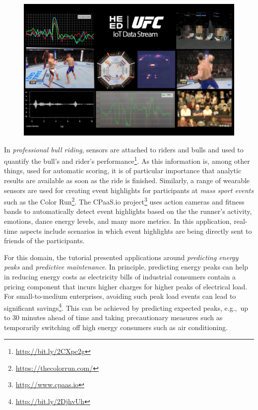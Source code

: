 \begin{figure}[t]
\centering
\includegraphics[scale=0.142]{pictures/DP6L8S9XkAYFMCw.jpg}
\vspace*{-2mm}
\label{FIG:FightStreams}
\vspace*{-5mm}
\end{figure}

In \emph{professional bull riding}, sensors are attached to riders and
bulls and used to quantify the bull's and rider's
performance\footnote{\url{http://bit.ly/2CXpc2g}}. As this information
is, among other things, used for automatic scoring, it is of
particular importance that analytic results are available as soon as
the ride is finished. Similarly, a range of wearable sensors are used
for creating event highlights for participants at \emph{mass sport
  events} such as the Color
Run\footnote{\url{https://thecolorrun.com/}}. The \textsf{\small
  CPaaS.io} project\footnote{\url{http://www.cpaas.io}} uses action
cameras and fitness bands to automatically detect event highlights
based on the the runner's activity, emotions, dance energy levels, and
many more metrics. In this application, real-time aspects include
scenarios in which event highlights are being directly sent to friends
of the participants.

For this domain, the tutorial presented applications around \emph{predicting energy peaks} and \emph{predictive maintenance}. In principle, predicting energy peaks can help in reducing energy costs as electricity bills of industrial consumers contain a pricing component that incurs higher charges for higher peaks of electrical load. For small-to-medium enterprises, avoiding such peak load events can lead to significant savings\footnote{\url{http://bit.ly/2DjhvUh}}. This can be achieved by predicting expected peaks, e.g.,\ up to 30 minutes ahead of time and taking precautionary measures such as temporarily switching off high energy consumers such as air conditioning.

